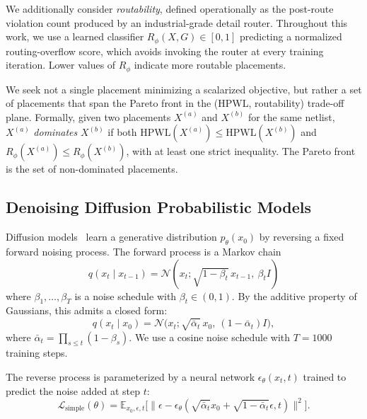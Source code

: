 \documentclass[lettersize,journal]{IEEEtran}
\begin{document}
We additionally consider \emph{routability}, defined operationally as the post-route violation count produced by an industrial-grade detail router. Throughout this work, we use a learned classifier $R_\phi(X, G) \in [0, 1]$ predicting a normalized routing-overflow score, which avoids invoking the router at every training iteration. Lower values of $R_\phi$ indicate more routable placements.

We seek not a single placement minimizing a scalarized objective, but rather a set of placements that span the Pareto front in the (HPWL, routability) trade-off plane. Formally, given two placements $X^{(a)}$ and $X^{(b)}$ for the same netlist, $X^{(a)}$ \emph{dominates} $X^{(b)}$ if both $\text{HPWL}(X^{(a)}) \le \text{HPWL}(X^{(b)})$ and $R_\phi(X^{(a)}) \le R_\phi(X^{(b)})$, with at least one strict inequality. The Pareto front is the set of non-dominated placements.

\subsection{Denoising Diffusion Probabilistic Models}

Diffusion models~\cite{sohl2015deep, ho2020ddpm} learn a generative distribution $p_\theta(x_0)$ by reversing a fixed forward noising process. The forward process is a Markov chain
\begin{equation}
\label{eq:forward}
q(x_t \mid x_{t-1}) = \mathcal{N}(x_t; \sqrt{1 - \beta_t}\, x_{t-1},\ \beta_t I)
\end{equation}
where $\beta_1, \dots, \beta_T$ is a noise schedule with $\beta_t \in (0, 1)$. By the additive property of Gaussians, this admits a closed form:
\begin{equation}
\label{eq:closedform}
q(x_t \mid x_0) = \mathcal{N}\!\big(x_t; \sqrt{\bar{\alpha}_t}\, x_0,\ (1 - \bar{\alpha}_t) I\big),
\end{equation}
where $\bar{\alpha}_t = \prod_{s \le t}\!(1 - \beta_s)$. We use a cosine noise schedule with $T = 1000$ training steps.

The reverse process is parameterized by a neural network $\epsilon_\theta(x_t, t)$ trained to predict the noise added at step $t$:
\begin{equation}
\label{eq:ddpm_loss}
\mathcal{L}_\text{simple}(\theta) = \mathbb{E}_{x_0, \epsilon, t}\!\big[\|\epsilon - \epsilon_\theta\!\left(\sqrt{\bar{\alpha}_t}x_0 \!+\! \sqrt{1\!-\!\bar{\alpha}_t}\epsilon, t\right)\!\|^2\big]\!.
\end{equation}
\end{document}
